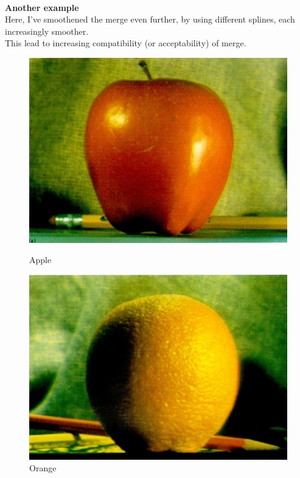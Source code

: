 \documentclass{article}
\begin{document}
    \\[5pt]\textbf{Another example}\\
    Here, I've smoothened the merge even further, by using different splines, each increasingly smoother.\\
    This lead to increasing compatibility (or acceptability) of merge.\\[3pt]
    \begin{figure}[!htb]
    \begin{center}
      \includegraphics[scale=.35]{./blending/ao/apple.png}
      \caption{Apple}
    \end{center}
    \endminipage \hfill
    \begin{center}
      \includegraphics[scale=.35]{./blending/ao/orange.png}
      \caption{Orange}
     \end{center}
    \endminipage \hfill
    \end{figure}
\end{document}
